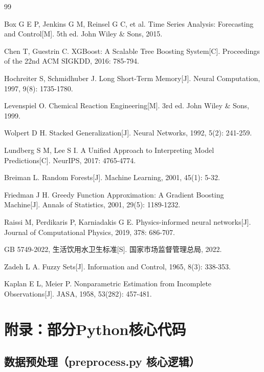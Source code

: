 \documentclass[12pt,a4paper]{ctexart}
\begin{document}
\newpage
\begin{thebibliography}{99}

 Box G E P, Jenkins G M, Reinsel G C, et al. Time Series Analysis: Forecasting and Control[M]. 5th ed. John Wiley \& Sons, 2015.

 Chen T, Guestrin C. XGBoost: A Scalable Tree Boosting System[C]. Proceedings of the 22nd ACM SIGKDD, 2016: 785-794.

 Hochreiter S, Schmidhuber J. Long Short-Term Memory[J]. Neural Computation, 1997, 9(8): 1735-1780.

 Levenspiel O. Chemical Reaction Engineering[M]. 3rd ed. John Wiley \& Sons, 1999.

 Wolpert D H. Stacked Generalization[J]. Neural Networks, 1992, 5(2): 241-259.

 Lundberg S M, Lee S I. A Unified Approach to Interpreting Model Predictions[C]. NeurIPS, 2017: 4765-4774.

 Breiman L. Random Forests[J]. Machine Learning, 2001, 45(1): 5-32.

 Friedman J H. Greedy Function Approximation: A Gradient Boosting Machine[J]. Annals of Statistics, 2001, 29(5): 1189-1232.

 Raissi M, Perdikaris P, Karniadakis G E. Physics-informed neural networks[J]. Journal of Computational Physics, 2019, 378: 686-707.

 GB 5749-2022, 生活饮用水卫生标准[S]. 国家市场监督管理总局, 2022.

 Zadeh L A. Fuzzy Sets[J]. Information and Control, 1965, 8(3): 338-353.

 Kaplan E L, Meier P. Nonparametric Estimation from Incomplete Observations[J]. JASA, 1958, 53(282): 457-481.

\end{thebibliography}

\newpage
\section*{附录：部分Python核心代码}

\subsection*{数据预处理（preprocess.py 核心逻辑）}
\end{document}
